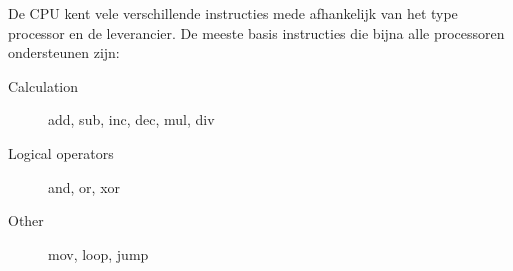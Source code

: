 De CPU kent vele verschillende instructies mede afhankelijk van het type processor en de leverancier. De meeste basis instructies die bijna alle processoren ondersteunen zijn:
\begin{description}
\item[Calculation] add, sub, inc, dec, mul, div
\item[Logical operators] and, or, xor
\item[Other] mov, loop, jump
\end{description}

